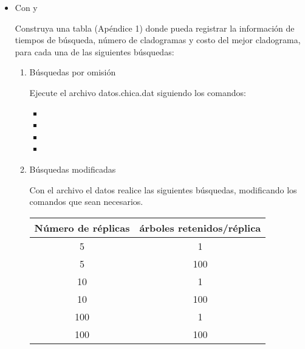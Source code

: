 \begin{itemize}
  \item Con  y 

	Construya una tabla (Ap\'endice 1) donde pueda registrar la informaci\'on de tiempos de b\'usqueda,   n\'umero de cladogramas y costo del mejor cladograma,  para cada una de las siguientes b\'usquedas:
 

	\begin{enumerate}
	  \item  {B\'usquedas por omisi\'on}

  		Ejecute el archivo datos.chica.dat siguiendo los comandos:

  		\begin{itemize}
  			\item  {}

  			

  			\item  {}

  			\item  {}


  			\item  {}

  		\end{itemize}



	  \item{B\'usquedas modificadas}

		Con el archivo el datos  realice las siguientes b\'usquedas,  modificando los comandos que sean necesarios.
 

 \begin{table}[H]
 \centering
 \begin{tabular}{|c|c|}
 \hline
  N\'umero de r\'eplicas & \'arboles retenidos/r\'eplica\\
 \hline
  5 & 1\\ 
   \hline
  5 & 100\\
   \hline 
  10& 1\\ 
   \hline
   10& 100\\
    \hline 
  100 & 1 \\
   \hline
   100 & 100 \\
  \hline
  

\end{tabular}
\end{table}
\end{enumerate}
\end{itemize}
